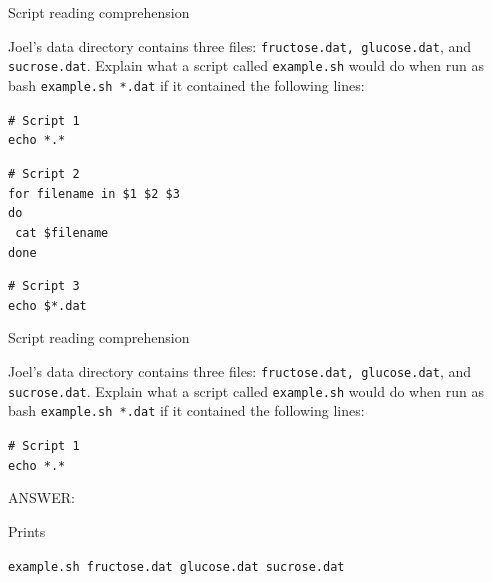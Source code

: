 \documentclass{beamer}
\begin{document}
\begin{frame}{Script reading comprehension}

Joel's data directory contains three files: \texttt{fructose.dat, glucose.dat}, and \texttt{sucrose.dat}. Explain what a script called \texttt{example.sh} would do when run as bash \texttt{example.sh *.dat} if it contained the following lines:
\vspace{0.5cm}


\begin{beamerboxesrounded}[upper=uppercolgreen,lower=lowercolgreen,shadow=false]{}
\small{\texttt{\# Script 1\\
echo *.*}}
\end{beamerboxesrounded}

\begin{beamerboxesrounded}[upper=uppercolgreen,lower=lowercolgreen,shadow=false]{}
\small{\texttt{\# Script 2\\
for filename in \$1 \$2 \$3\\
do\\}
\texttt{         cat \$filename\\}
\texttt{done\\}}
\end{beamerboxesrounded}

\begin{beamerboxesrounded}[upper=uppercolgreen,lower=lowercolgreen,shadow=false]{}
\small{\texttt{\# Script 3\\
echo \$*.dat}}
\end{beamerboxesrounded}


\end{frame}


\begin{frame}{Script reading comprehension}

Joel's data directory contains three files: \texttt{fructose.dat, glucose.dat}, and \texttt{sucrose.dat}. Explain what a script called \texttt{example.sh} would do when run as bash \texttt{example.sh *.dat} if it contained the following lines:
\vspace{0.5cm}


\begin{beamerboxesrounded}[upper=uppercolgreen,lower=lowercolgreen,shadow=false]{}
\small{\texttt{\# Script 1\\
echo *.*}}
\end{beamerboxesrounded}

\alert{ANSWER:}

Prints 

\texttt{example.sh fructose.dat   glucose.dat    sucrose.dat}   

\end{frame}
\end{document}
